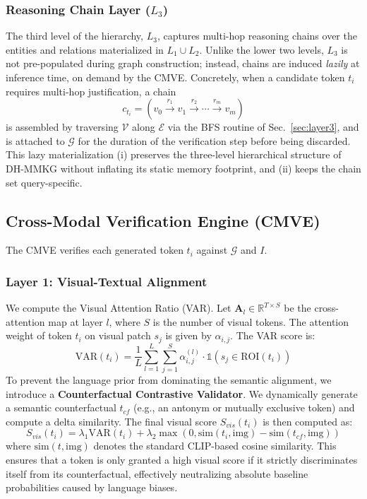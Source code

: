 \subsubsection{Reasoning Chain Layer ($L_3$)}
\label{sec:l3}
The third level of the hierarchy, $L_3$, captures multi-hop reasoning chains over the entities and relations materialized in $L_1 \cup L_2$. Unlike the lower two levels, $L_3$ is not pre-populated during graph construction; instead, chains are induced \emph{lazily} at inference time, on demand by the CMVE. Concretely, when a candidate token $t_i$ requires multi-hop justification, a chain
\begin{equation}
c_{t_i} = (v_0 \xrightarrow{r_1} v_1 \xrightarrow{r_2} \cdots \xrightarrow{r_m} v_m)
\end{equation}
is assembled by traversing $\mathcal{V}$ along $\mathcal{E}$ via the BFS routine of Sec.~\ref{sec:layer3}, and is attached to $\mathcal{G}$ for the duration of the verification step before being discarded. This lazy materialization (i) preserves the three-level hierarchical structure of DH-MMKG without inflating its static memory footprint, and (ii) keeps the chain set query-specific.

\subsection{Cross-Modal Verification Engine (CMVE)}
The CMVE verifies each generated token $t_i$ against $\mathcal{G}$ and $I$.

\subsubsection{Layer 1: Visual-Textual Alignment}
We compute the Visual Attention Ratio (VAR). Let $\mathbf{A}_l \in \mathbb{R}^{T \times S}$ be the cross-attention map at layer $l$, where $S$ is the number of visual tokens. The attention weight of token $t_i$ on visual patch $s_j$ is given by $\alpha_{i,j}$. The VAR score is:
\begin{equation}
\text{VAR}(t_i) = \frac{1}{L} \sum_{l=1}^{L} \sum_{j=1}^{S} \alpha_{i,j}^{(l)} \cdot \mathbb{1}(s_j \in \text{ROI}(t_i))
\end{equation}
To prevent the language prior from dominating the semantic alignment, we introduce a \textbf{Counterfactual Contrastive Validator}. We dynamically generate a semantic counterfactual $t_{cf}$ (e.g., an antonym or mutually exclusive token) and compute a delta similarity. The final visual score $S_{vis}(t_i)$ is then computed as:
\begin{equation}
S_{vis}(t_i) = \lambda_1 \text{VAR}(t_i) + \lambda_2 \max\left(0, \text{sim}(t_i, \text{img}) - \text{sim}(t_{cf}, \text{img})\right)
\end{equation}
where $\text{sim}(t, \text{img})$ denotes the standard CLIP-based cosine similarity. This ensures that a token is only granted a high visual score if it strictly discriminates itself from its counterfactual, effectively neutralizing absolute baseline probabilities caused by language biases.

